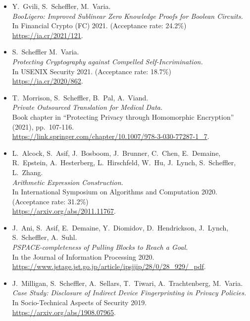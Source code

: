 \documentclass{res}
\begin{document}
\begin{resume}
\begin{itemize}
\item[\booligero] Y.~Gvili, S.~Scheffler, M.~Varia. \\
\emph{BooLigero: Improved Sublinear Zero Knowledge Proofs for Boolean Circuits.} \\
In Financial Crypto (FC) 2021.  (Acceptance rate: 24.2\%) \\
\url{https://ia.cr/2021/121}.

\item[\foregoneconclusion] S.~Scheffler M.~Varia. \\
\emph{Protecting Cryptography against Compelled Self-Incrimination.} \\
In USENIX Security 2021. (Acceptance rate: 18.7\%)\\
\url{https://ia.cr/2020/862}.

\item[\privateTranslation] T.~Morrison, S.~Scheffler, B.~Pal, A.~Viand. \\
\emph{Private Outsourced Translation for Medical Data.} \\
Book chapter in ``Protecting Privacy through Homomorphic Encryption'' (2021), pp.~107-116. \\
\url{https://link.springer.com/chapter/10.1007/978-3-030-77287-1_7}.

\item[\AEC] L.~Alcock, S.~Asif, J.~Bosboom, J.~Brunner, C.~Chen, E.~Demaine, R.~Epstein,
A.~Hesterberg, L.~Hirschfeld, W.~Hu, J.~Lynch, S.~Scheffler, L.~Zhang. \\
\emph{Arithmetic Expression Construction.} \\
In International Symposium on Algorithms and Computation 2020. (Acceptance rate: 31.2\%) \\
\url{https://arxiv.org/abs/2011.11767}.

\item[\pullingblocksJIP] J.~Ani, S.~Asif, E.~Demaine, Y.~Diomidov, D.~Hendrickson, J.~Lynch, S.~Scheffler, A.~Suhl. \\
\emph{PSPACE-completeness of Pulling Blocks to Reach a Goal.} \\
In the Journal of Information Processing 2020.\\
\url{https://www.jstage.jst.go.jp/article/ipsjjip/28/0/28_929/_pdf}.

\item[\devicefingerprinting] J.~Milligan, S.~Scheffler, A.~Sellars, T.~Tiwari, A.~Trachtenberg, M.~Varia.  \\
\emph{Case Study: Disclosure of Indirect Device Fingerprinting in Privacy Policies.} \\
In Socio-Technical Aspects of Security 2019. \\
\url{https://arxiv.org/abs/1908.07965}.


\end{itemize}
\end{resume}
\end{document}
